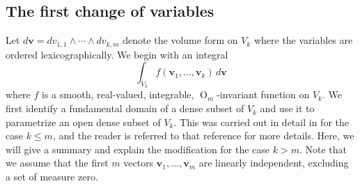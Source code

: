 \documentclass[twoside]{amsart}
\theoremstyle{definition}
\theoremstyle{remark}
\numberwithin{equation}{section}
\newcommand{\OO}{\operatorname{O}}
\begin{document}

\subsection{The first change of variables}
\label{subsec:Om_COV1}

Let $d\mathbf{v} = dv_{1,1}\wedge\cdots\wedge dv_{k,m}$ denote the volume form on $V_k$ where the variables are ordered lexicographically.
We begin with an integral
\begin{equation}
\label{eq:Om_Int0}
    \int_{V_k} f(\mathbf{v}_1, \ldots, \mathbf{v}_k) \, d\mathbf{v}
\end{equation}
where $f$ is a smooth, real-valued, integrable, $\OO_m$-invariant function on $V_k$. We first identify a fundamental domain of a dense subset of $V_k$ and use it
to parametrize an open dense subset of $V_k$. This was carried out in detail in \cite[Sec.~3.1]{HerbigSeatonWhitesell} for the case $k \leq m$, and the reader is referred
to that reference for more details. Here, we will give a summary and explain the modification for the case $k > m$. Note that we assume that the first $m$ vectors
$\mathbf{v}_1, \ldots, \mathbf{v}_m$ are linearly independent, excluding a set of measure zero.
\end{document}
